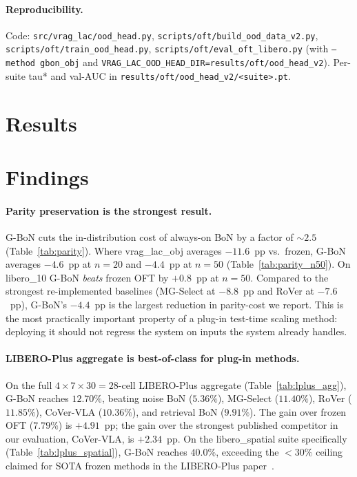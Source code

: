 \documentclass{article}
\begin{document}
\paragraph{Reproducibility.}
Code: \texttt{src/vrag\_lac/ood\_head.py},
\texttt{scripts/oft/build\_ood\_data\_v2.py},
\texttt{scripts/oft/train\_ood\_head.py},
\texttt{scripts/oft/eval\_oft\_libero.py} (with
\texttt{--method gbon\_obj} and
\texttt{VRAG\_LAC\_OOD\_HEAD\_DIR=results/oft/ood\_head\_v2}).
Per-suite tau* and val-AUC in
\texttt{results/oft/ood\_head\_v2/<suite>.pt}.

\section{Results}
\label{sec:results}



\section{Findings}
\label{sec:findings}

\paragraph{Parity preservation is the strongest result.}
G-BoN cuts the in-distribution cost of always-on BoN by a factor of
$\sim\!2.5$ (Table~\ref{tab:parity}). Where vrag\_lac\_obj averages
$-11.6$~pp vs.\ frozen, G-BoN averages $-4.6$~pp at $n{=}20$ and
$-4.4$~pp at $n{=}50$ (Table~\ref{tab:parity_n50}). On libero\_10
G-BoN \emph{beats} frozen OFT by $+0.8$~pp at $n{=}50$. Compared to
the strongest re-implemented baselines (MG-Select at
$-8.8$~pp and RoVer at $-7.6$~pp), G-BoN's $-4.4$~pp is the
largest reduction in parity-cost we report. This is the most
practically important property of a plug-in test-time scaling method:
deploying it should not regress the system on inputs the system
already handles.

\paragraph{LIBERO-Plus aggregate is best-of-class for plug-in
methods.}
On the full $4{\times}7{\times}30 = 28$-cell LIBERO-Plus aggregate
(Table~\ref{tab:lplus_agg}), G-BoN reaches $12.70\%$, beating
noise BoN ($5.36\%$), MG-Select ($11.40\%$),
RoVer ($11.85\%$), CoVer-VLA ($10.36\%$), and retrieval
BoN ($9.91\%$). The gain over frozen OFT ($7.79\%$) is
$+4.91$~pp; the gain over the strongest published competitor
in our evaluation, CoVer-VLA, is $+2.34$~pp. On the libero\_spatial
suite specifically (Table~\ref{tab:lplus_spatial}), G-BoN reaches
$40.0\%$, exceeding the $<\!30\%$ ceiling claimed for SOTA frozen
methods in the LIBERO-Plus paper~\citep{libero_plus2025}.
\end{document}
